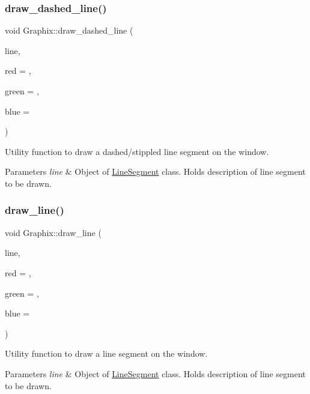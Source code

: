\subsubsection{\texorpdfstring{draw\_dashed\_line()}{draw\_dashed\_line()}}
{\footnotesize\ttfamily void Graphix\+::draw\+\_\+dashed\+\_\+line (\begin{DoxyParamCaption}\item[{\mbox{\hyperlink{class_line_segment}{Line\+Segment}}}]{line,  }\item[{G\+Lfloat}]{red = {},  }\item[{G\+Lfloat}]{green = {},  }\item[{G\+Lfloat}]{blue = {} }\end{DoxyParamCaption})}

Utility function to draw a dashed/stippled line segment on the window. 
\begin{DoxyParams}{Parameters}
{\em line} & Object of \mbox{\hyperlink{class_line_segment}{Line\+Segment}} class. Holds description of line segment to be drawn. \\
\hline
\end{DoxyParams}
\mbox{\label{class_graphix_a74af1cd957a0fc3b5e0ee1f951a994e1}} 
\subsubsection{\texorpdfstring{draw\_line()}{draw\_line()}}
{\footnotesize\ttfamily void Graphix\+::draw\+\_\+line (\begin{DoxyParamCaption}\item[{\mbox{\hyperlink{class_line_segment}{Line\+Segment}}}]{line,  }\item[{G\+Lfloat}]{red = {},  }\item[{G\+Lfloat}]{green = {},  }\item[{G\+Lfloat}]{blue = {} }\end{DoxyParamCaption})}

Utility function to draw a line segment on the window. 
\begin{DoxyParams}{Parameters}
{\em line} & Object of \mbox{\hyperlink{class_line_segment}{Line\+Segment}} class. Holds description of line segment to be drawn. \\
\hline
\end{DoxyParams}
\mbox{\label{class_graphix_af7b539b3ab40274dc2f89d060cba0c51}} 
